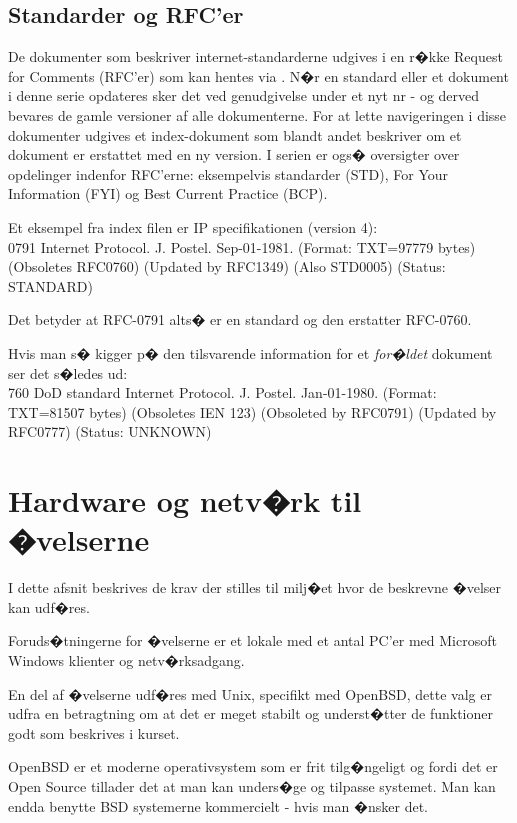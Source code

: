 \documentclass[a4paper,11pt,notitlepage]{oevelser}
\begin{document}
\section*{\color{titlecolor}Standarder og RFC'er}
De dokumenter som beskriver internet-standarderne udgives i en r�kke
Request for Comments (RFC'er) som kan hentes via
. N�r en standard eller et dokument i
denne serie opdateres sker det ved genudgivelse under et nyt nr - og
derved bevares de gamle versioner af alle dokumenterne. For at lette
navigeringen i disse dokumenter udgives et index-dokument som blandt
andet beskriver om et dokument er erstattet med en ny version. I
serien er ogs� oversigter over opdelinger indenfor RFC'erne:
eksempelvis standarder (STD), For Your Information (FYI) og Best
Current Practice (BCP).

Et eksempel fra index filen er IP specifikationen (version 4):\\
0791 Internet Protocol. J. Postel. Sep-01-1981. (Format: TXT=97779
bytes) (Obsoletes RFC0760) (Updated by RFC1349) (Also STD0005)
(Status: STANDARD)

Det betyder at RFC-0791 alts� er en standard og den erstatter
RFC-0760.

Hvis man s� kigger p� den tilsvarende information for et
\emph{for�ldet} dokument ser det s�ledes ud:\\
760 DoD standard Internet Protocol. J. Postel. Jan-01-1980. (Format:
TXT=81507 bytes) (Obsoletes IEN 123) (Obsoleted by RFC0791) (Updated
by RFC0777) (Status: UNKNOWN)


\chapter*{\color{titlecolor}Hardware og netv�rk til �velserne}

I dette afsnit beskrives de krav der stilles til milj�et hvor de
beskrevne �velser kan udf�res.

Foruds�tningerne for �velserne er et lokale med et antal PC'er
med Microsoft Windows klienter og netv�rksadgang.

En del af �velserne udf�res med Unix, specifikt med OpenBSD, dette
valg er udfra en betragtning om at det er meget stabilt og
underst�tter de funktioner godt som beskrives i kurset.

OpenBSD er et moderne operativsystem som er frit tilg�ngeligt og fordi
det er Open Source tillader det at man kan unders�ge og tilpasse
systemet. Man kan endda benytte BSD systemerne kommercielt - hvis man
�nsker det.
\end{document}
